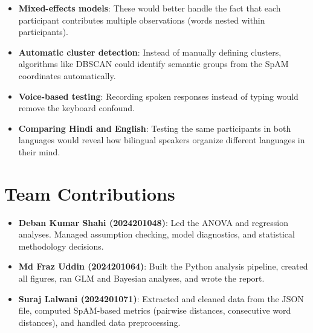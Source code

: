 \documentclass[12pt, a4paper]{article}
\begin{document}
\begin{itemize}[nosep]
    \item \textbf{Mixed-effects models}: These would better handle the fact that each participant contributes multiple observations (words nested within participants).
    \item \textbf{Automatic cluster detection}: Instead of manually defining clusters, algorithms like DBSCAN could identify semantic groups from the SpAM coordinates automatically.
    \item \textbf{Voice-based testing}: Recording spoken responses instead of typing would remove the keyboard confound.
    \item \textbf{Comparing Hindi and English}: Testing the same participants in both languages would reveal how bilingual speakers organize different languages in their mind.
\end{itemize}


\section{Team Contributions}

\begin{itemize}[nosep]
    \item \textbf{Deban Kumar Shahi (2024201048)}: Led the ANOVA and regression analyses. Managed assumption checking, model diagnostics, and statistical methodology decisions.
    \item \textbf{Md Fraz Uddin (2024201064)}: Built the Python analysis pipeline, created all figures, ran GLM and Bayesian analyses, and wrote the report.
    \item \textbf{Suraj Lalwani (2024201071)}: Extracted and cleaned data from the JSON file, computed SpAM-based metrics (pairwise distances, consecutive word distances), and handled data preprocessing.
\end{itemize}
\end{document}
